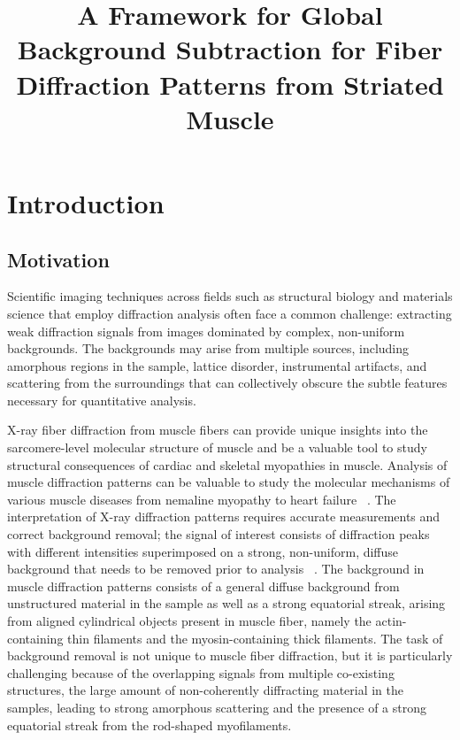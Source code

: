 \documentclass[iucr,review]{iucrjournals}
\title{A Framework for Global Background Subtraction for Fiber Diffraction
Patterns from Striated Muscle}
\begin{document}
\maketitle

\begin{synopsis}
\end{synopsis}

\begin{abstract}
\end{abstract}


\section{Introduction}
\subsection{Motivation}

Scientific imaging techniques across fields such as structural biology and materials science that employ diffraction analysis
often face a common challenge:
extracting weak diffraction signals from images dominated by complex, non-uniform backgrounds.
The backgrounds may arise from multiple sources, including amorphous regions in the sample, lattice disorder, instrumental artifacts, and scattering from
the surroundings that can collectively obscure the subtle features necessary for quantitative analysis.

X-ray fiber diffraction from muscle fibers can provide unique
insights into the sarcomere-level molecular structure of muscle and be a valuable tool to study structural consequences of
cardiac and skeletal myopathies in muscle. Analysis of muscle diffraction patterns
can be valuable to study the molecular mechanisms of various muscle diseases from nemaline myopathy 
to heart failure ~\cite{MaIrving2022}. The interpretation of X-ray diffraction patterns
requires accurate measurements and correct background removal; the signal of interest consists
of diffraction peaks with different intensities
superimposed on a strong, non-uniform,
diffuse background that needs to be removed prior to analysis ~\cite{ResearchPlanMusico}.
The background in muscle diffraction patterns consists of a general diffuse
background from unstructured material in the sample as well as a strong equatorial streak,
arising from aligned cylindrical objects present in muscle fiber, namely the actin-containing thin filaments and the myosin-containing thick filaments.
The task of background removal is not unique to muscle fiber diffraction, but it is particularly challenging 
because of the overlapping signals from multiple co-existing structures, the large amount of non-coherently diffracting material in the samples, leading
to strong amorphous scattering and the presence of a strong equatorial streak from the rod-shaped myofilaments.
\end{document}
